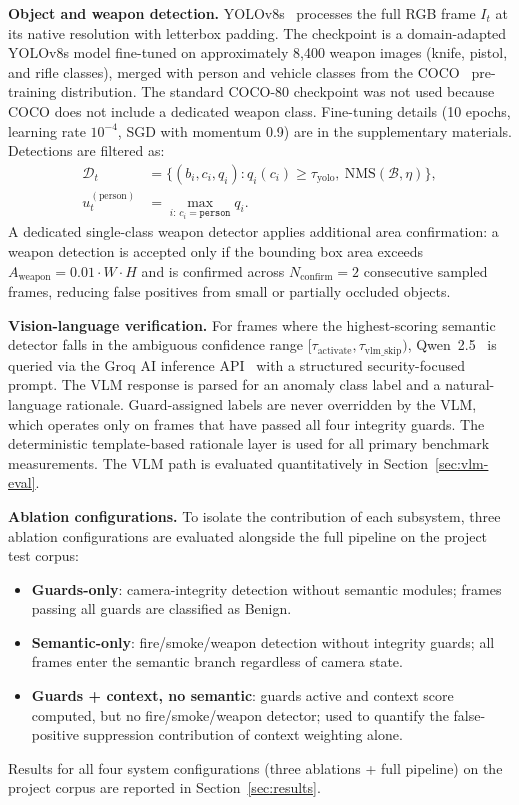 \documentclass[sensors,article,submit,pdftex,moreauthors]{Definitions/mdpi}
\begin{document}
\textbf{Object and weapon detection.} YOLOv8s~\cite{aboah2023vision} processes the full RGB frame $I_t$ at its native resolution with letterbox padding. The checkpoint is a domain-adapted YOLOv8s model fine-tuned on approximately 8{,}400 weapon images (knife, pistol, and rifle classes), merged with person and vehicle classes from the COCO~\cite{lin2014microsoft} pre-training distribution. The standard COCO-80 checkpoint was not used because COCO does not include a dedicated weapon class. Fine-tuning details (10 epochs, learning rate $10^{-4}$, SGD with momentum 0.9) are in the supplementary materials. Detections are filtered as:
\begin{equation}
\begin{aligned}
\mathcal{D}_t &= \{(b_i, c_i, q_i) : q_i(c_i) \ge \tau_{\text{yolo}},\ \mathrm{NMS}(\mathcal{B}, \eta)\}, \\
u_t^{(\text{person})} &= \max_{i:\,c_i=\texttt{person}} q_i.
\end{aligned}
\end{equation}
A dedicated single-class weapon detector applies additional area confirmation: a weapon detection is accepted only if the bounding box area exceeds $A_{\text{weapon}} = 0.01 \cdot W \cdot H$ and is confirmed across $N_{\text{confirm}} = 2$ consecutive sampled frames, reducing false positives from small or partially occluded objects.
 
\textbf{Vision-language verification.} For frames where the highest-scoring semantic detector falls in the ambiguous confidence range $[\tau_{\text{activate}}, \tau_{\text{vlm\_skip}})$, Qwen~2.5~\cite{qwen25vl2025} is queried via the Groq AI inference API~\cite{groqapi2025} with a structured security-focused prompt. The VLM response is parsed for an anomaly class label and a natural-language rationale. Guard-assigned labels are never overridden by the VLM, which operates only on frames that have passed all four integrity guards. The deterministic template-based rationale layer is used for all primary benchmark measurements. The VLM path is evaluated quantitatively in Section~\ref{sec:vlm-eval}.
 
\textbf{Ablation configurations.} To isolate the contribution of each subsystem, three ablation configurations are evaluated alongside the full pipeline on the project test corpus:
\begin{itemize}[leftmargin=2em]
\item \textbf{Guards-only}: camera-integrity detection without semantic modules; frames passing all guards are classified as Benign.
\item \textbf{Semantic-only}: fire/smoke/weapon detection without integrity guards; all frames enter the semantic branch regardless of camera state.
\item \textbf{Guards + context, no semantic}: guards active and context score computed, but no fire/smoke/weapon detector; used to quantify the false-positive suppression contribution of context weighting alone.
\end{itemize}
Results for all four system configurations (three ablations + full pipeline) on the project corpus are reported in Section~\ref{sec:results}.
 
\end{document}
